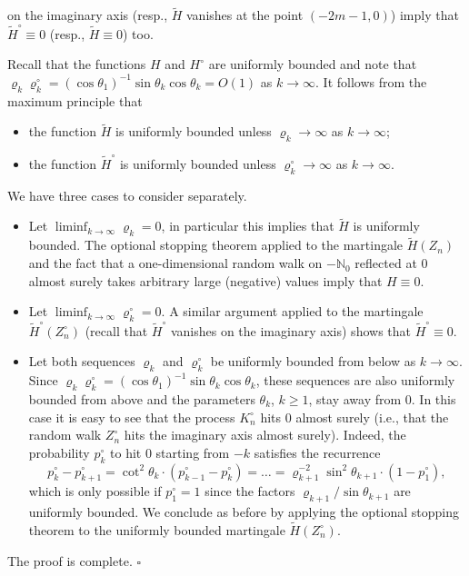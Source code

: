 \documentclass[11pt]{article}
\newcommand{\Htil}{\widetilde{H}}
\newcommand{\Htilo}{\widetilde{H}^{\circ}}
\begin{document}
on the imaginary axis (resp., $\Htil$ vanishes at the point $(-2m-1,0)$)
imply that $\Htilo \equiv 0$ (resp., $\Htil \equiv 0$) too.

Recall that the functions $H$ and $H^{\circ}$ are uniformly bounded and note
that $\varrho_k\varrho^{\circ}_k = (\cos\theta_1)^{-1}\sin\theta_k\cos\theta_k
= O(1)$ as $k \to \infty$. It follows from the maximum principle that
\begin{itemize}
\item the function $\Htil$ is uniformly bounded unless $\varrho_k \to \infty$
as $k \to \infty$;
\item the function $\Htilo$ is uniformly bounded unless
$\varrho^{\circ}_k \to \infty$ as $k \to \infty$.
\end{itemize}
We have three cases to consider separately.
\begin{itemize}
\item Let $\liminf_{k\to\infty}\varrho_k = 0$, in particular this implies that
$\Htil$ is uniformly bounded. The optional stopping theorem applied to the
martingale $\Htil(Z_n)$ and the fact that a one-dimensional random walk on
$-\mathbb{N}_0$ reflected at $0$ almost surely takes arbitrary large
(negative) values imply that $H \equiv 0$.
\item Let $\liminf_{k\to\infty}\varrho^{\circ}_k = 0$. A similar argument
applied to the martingale $\Htilo(Z_n^{\circ})$ (recall that $\Htilo$ vanishes
on the imaginary axis) shows that $\Htilo \equiv 0$.
\item Let both sequences $\varrho_k$ and $\varrho^{\circ}_k$ be uniformly
bounded from below as $k \to \infty$. Since
$\varrho_k\varrho^{\circ}_k = (\cos\theta_1)^{-1}\sin\theta_k\cos\theta_k$,
these sequences are also uniformly bounded from above and the parameters
$\theta_k$, $k \geqslant 1$, stay away from $0$. In this case it is easy to
see that the process $K_n^{\circ}$ hits $0$ almost surely (i.e., that the
random walk $Z_n^{\circ}$ hits the imaginary axis almost surely). Indeed, the
probability $p_k^{\circ}$ to hit $0$ starting from $-k$ satisfies the
recurrence
\[
p_k^{\circ}-p_{k+1}^{\circ} = \cot^2\theta_k\cdot(p_{k-1}^{\circ}-p_k^{\circ})
= \dots = \varrho_{k+1}^{-2}\sin^2\theta_{k+1}\cdot(1-p_1^{\circ}),
\]
which is only possible if $p_1^{\circ} = 1$ since the factors
$\varrho_{k+1}/\sin\theta_{k+1}$ are uniformly bounded. We conclude as before
by applying the optional stopping theorem to the uniformly bounded martingale
$\Htil(Z_n^{\circ})$.
\end{itemize}
The proof is complete. \hfill$\square$
\end{document}
